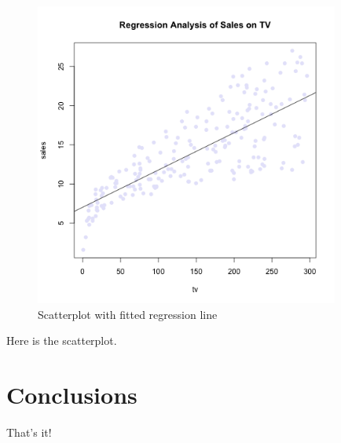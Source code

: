 \documentclass{article}\usepackage[]{graphicx}\usepackage[]{color}
\begin{document}
\begin{figure}[!ht]
\centering
\includegraphics[width=10cm]{scatterplot-tv-sales.png}
\caption{Scatterplot with fitted regression line}
\end{figure}

Here is the scatterplot.

\section*{Conclusions}
That's it!
\end{document}
